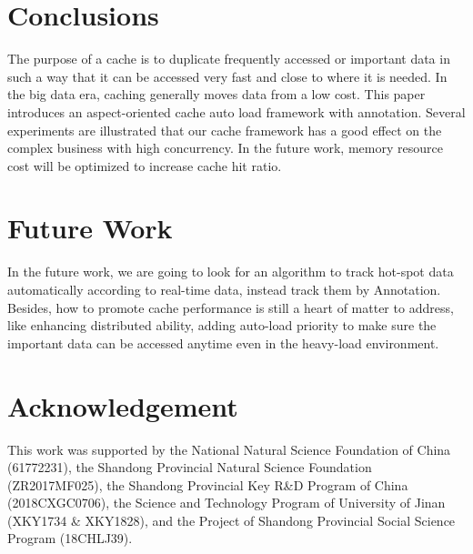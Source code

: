\documentclass{singlecol-new}
\theoremstyle{TH}{
\newtheorem{lemma}{Lemma}
\newtheorem{theorem}[lemma]{Theorem}
\newtheorem{corrolary}[lemma]{Corrolary}
\newtheorem{conjecture}[lemma]{Conjecture}
\newtheorem{proposition}[lemma]{Proposition}
\newtheorem{claim}[lemma]{Claim}
\newtheorem{stheorem}[lemma]{Wrong Theorem}
}
\theoremstyle{THrm}{
\newtheorem{definition}{Definition}[section]
\newtheorem{question}{Question}[section]
\newtheorem{remark}{Remark}
\newtheorem{scheme}{Scheme}
}
\theoremstyle{THhit}{
\newtheorem{case}{Case}[section]
}
\begin{document}
\section{Conclusions}
\label{Conclusions}

The purpose of a cache is to duplicate frequently accessed or important data in such a way that it can be accessed very fast and close to where it is needed. In the big data era, caching generally moves data from a low cost. This paper introduces an aspect-oriented cache auto load framework with annotation. Several experiments are illustrated that our cache framework has a good effect on the complex business with high concurrency. In the future work, memory resource cost will be optimized to increase cache hit ratio.

\section{Future Work}
\label{futurework}

In the future work, we are going to look for an algorithm to track hot-spot data automatically according to real-time data, instead track them by Annotation. Besides, how to promote cache performance is still a heart of matter to address, like enhancing distributed ability, adding auto-load priority to make sure the important data can be accessed anytime even in the heavy-load environment.


\section*{Acknowledgement}
This work was supported by the National Natural Science Foundation of China (61772231), the Shandong Provincial Natural Science Foundation (ZR2017MF025), the Shandong Provincial Key R\&D Program of China (2018CXGC0706), the Science and Technology Program of University of Jinan (XKY1734 \& XKY1828), and the Project of Shandong Provincial Social Science Program (18CHLJ39).



%
%
%



\end{document}

